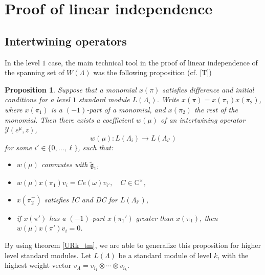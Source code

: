 \documentclass[a4paper, 10pt,oneside]{amsart}
\newtheorem{prop}[tm]{Proposition}
\begin{document}
\section{Proof of linear independence}

\label{LinNez_pogl}

\subsection{Intertwining operators}

In the level $1$ case, the main technical tool in the proof of
linear independence of the spanning set of $W(\Lambda)$ was the following
proposition (cf. [T])

\begin{prop} \label{OpIsp1_prop}
Suppose that a monomial  $x(\pi)$ satisfies difference and initial
conditions for a level $1$ standard module $L(\Lambda_i)$. Write
$x(\pi)=x(\pi_1)x(\pi_2)$, where $x(\pi_1)$ is a $(-1)$-part of a
monomial, and $x(\pi_2)$ the rest of the monomial. Then there
exists a coefficient $w(\mu)$ of an intertwining operator
${\mathcal Y}(e^\mu,z)$,
$$w(\mu):L(\Lambda_i) \to L(\Lambda_{i'})$$
for some $i'\in\{0,\dots,\ell\}$, such that:
\begin{itemize}
\item $w(\mu)$ commutes with ${\tilde{{\mathfrak g}}}_1$,
\item $w(\mu)x(\pi_1)v_i = C e(\omega)
v_{i'},\quad C\in{{\mathbb C}}^\times$,
\item $x(\pi_2^+)$ satisfies IC and DC for $L(\Lambda_{i'})$,
\item if  $x(\pi')$ has a $(-1)$-part $x(\pi_1')$  greater than $x(\pi_1)$, then $w(\mu)x(\pi')v_i=0$.
\end{itemize}
\end{prop}

By using theorem \ref{URk_tm}, we are able to generalize this proposition for higher level standard modules. Let $L(\Lambda)$ be a
standard module of level $k$, with the highest
weight vector $v_\Lambda=v_{i_1}\otimes\cdots\otimes v_{i_k}$.
\end{document}
